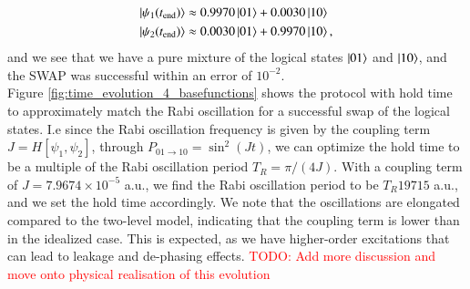 \documentclass{subfiles}
\begin{document}
\begin{align*}
    \ket{\psi_1(t_{\text{end}})} &\approx 0.9970 \ket{01} + 0.0030 \ket{10}  \\
    \ket{\psi_2(t_{\text{end}})} &\approx 0.0030 \ket{01} + 0.9970 \ket{10},
\end{align*}
and we see that we have a pure mixture of the logical states $\ket{01}$ and $\ket{10}$, and the SWAP was successful within an error of $10^{-2}$.
\\
Figure \ref{fig:time_evolution_4_basefunctions} shows the protocol with hold time to approximately match the Rabi oscillation for a successful swap of the logical states. I.e since the Rabi oscillation frequency is given by the coupling term $J = H[\psi_1, \psi_2]$, through $P_{01\to10} = \sin^2(J t)$, we can optimize the hold time to be a multiple of the Rabi oscillation period $T_R = \pi/(4J)$. With a coupling term of $J = 7.9674 \times 10^{-5}$ a.u., we find the Rabi oscillation period to be $T_R 19715 $ a.u., and we set the hold time accordingly. We note that the oscillations are elongated compared to the two-level model, indicating that the coupling term is lower than in the idealized case. This is expected, as we have higher-order excitations that can lead to leakage and de-phasing effects. \textcolor{red}{TODO: Add more discussion and move onto physical realisation of this evolution}
\end{document}
